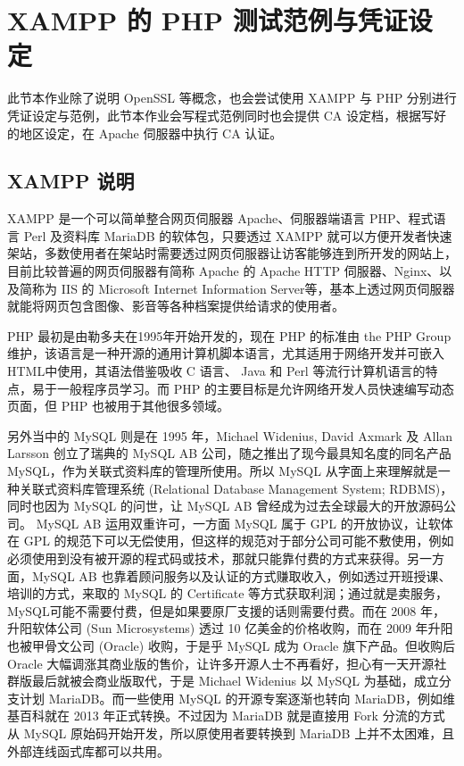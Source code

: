 \section{XAMPP 的 PHP 测试范例与凭证设定}

此节本作业除了说明 OpenSSL 等概念，也会尝试使用 XAMPP 与 PHP 分别进行凭证设定与范例，此节本作业会写程式范例同时也会提供 CA 设定档，根据写好的地区设定，在 Apache 伺服器中执行 CA 认证。

\subsection{XAMPP 说明}

XAMPP 是一个可以简单整合网页伺服器 Apache、伺服器端语言 PHP、程式语言 Perl 及资料库 MariaDB 的软体包，只要透过 XAMPP 就可以方便开发者快速架站，多数使用者在架站时需要透过网页伺服器让访客能够连到所开发的网站上，目前比较普遍的网页伺服器有简称 Apache 的 Apache HTTP 伺服器、Nginx、以及简称为 IIS 的 Microsoft Internet Information Server等，基本上透过网页伺服器就能将网页包含图像、影音等各种档案提供给请求的使用者。

PHP 最初是由勒多夫在1995年开始开发的，现在 PHP 的标准由 the PHP Group 维护，该语言是一种开源的通用计算机脚本语言，尤其适用于网络开发并可嵌入HTML中使用，其语法借鉴吸收 C 语言、 Java 和 Perl 等流行计算机语言的特点，易于一般程序员学习。而 PHP 的主要目标是允许网络开发人员快速编写动态页面，但 PHP 也被用于其他很多领域。

另外当中的 MySQL 则是在 1995 年，Michael Widenius, David Axmark 及 Allan Larsson 创立了瑞典的 MySQL AB 公司，随之推出了现今最具知名度的同名产品 MySQL，作为关联式资料库的管理所使用。所以 MySQL 从字面上来理解就是一种关联式资料库管理系统 (Relational Database Management System; RDBMS)，同时也因为 MySQL 的问世，让 MySQL AB 曾经成为过去全球最大的开放源码公司。
MySQL AB 运用双重许可，一方面 MySQL 属于 GPL 的开放协议，让软体在 GPL 的规范下可以无偿使用，但这样的规范对于部分公司可能不敷使用，例如必须使用到没有被开源的程式码或技术，那就只能靠付费的方式来获得。另一方面，MySQL AB 也靠着顾问服务以及认证的方式赚取收入，例如透过开班授课、培训的方式，来取的 MySQL 的 Certificate 等方式获取利润；通过就是卖服务，MySQL可能不需要付费，但是如果要原厂支援的话则需要付费。而在 2008 年，升阳软体公司 (Sun Microsystems) 透过 10 亿美金的价格收购，而在 2009 年升阳也被甲骨文公司 (Oracle) 收购，于是乎 MySQL 成为 Oracle 旗下产品。但收购后 Oracle 大幅调涨其商业版的售价，让许多开源人士不再看好，担心有一天开源社群版最后就被会商业版取代，于是 Michael Widenius 以 MySQL 为基础，成立分支计划 MariaDB。而一些使用 MySQL 的开源专案逐渐也转向 MariaDB，例如维基百科就在 2013 年正式转换。不过因为 MariaDB 就是直接用 Fork 分流的方式从 MySQL 原始码开始开发，所以原使用者要转换到 MariaDB 上并不太困难，且外部连线函式库都可以共用。

